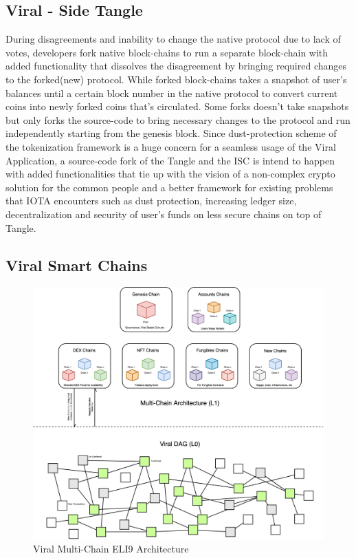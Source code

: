 \documentclass[10pt]{article}
\begin{document}
\subsection{Viral - Side Tangle}

During disagreements and inability to change the native protocol due to lack of votes, developers fork native block-chains to run a separate block-chain with added functionality that dissolves the disagreement by bringing required changes to the forked(new) protocol. While forked block-chains takes a snapshot of user's balances until a certain block number in the native protocol to convert current coins into newly forked coins that's circulated. Some forks doesn't take snapshots but only forks the source-code to bring necessary changes to the protocol and run independently starting from the genesis block. Since dust-protection scheme of the tokenization framework is a huge concern for a seamless usage of the Viral Application, a source-code fork of the Tangle and the ISC is intend to happen with added functionalities that tie up with the vision of a non-complex crypto solution for the common people and a better framework for existing problems that IOTA encounters such as dust protection, increasing ledger size, decentralization and security of user's funds on less secure chains on top of Tangle.











\subsection{Viral Smart Chains}

\begin{figure}[H]
\includegraphics[width=\textwidth]{Architecture}
\caption{Viral Multi-Chain ELI9 Architecture}
\end{figure}
\end{document}
